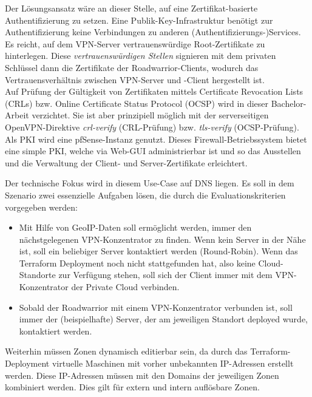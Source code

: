 Der Lösungsansatz wäre an dieser Stelle, auf eine Zertifikat-basierte Authentifizierung zu setzen. Eine Publik-Key-Infrastruktur benötigt zur Authentifizierung keine Verbindungen zu anderen (Authentifizierungs-)Services. Es reicht, auf dem VPN-Server vertrauenswürdige Root-Zertifikate zu hinterlegen. Diese \textit{vertrauenswürdigen Stellen} signieren mit dem privaten Schlüssel dann die Zertifikate der Roadwarrior-Clients, wodurch das Vertrauensverhältnis zwischen VPN-Server und -Client hergestellt ist.\\
Auf Prüfung der Gültigkeit von Zertifikaten mittels Certificate Revocation Lists (CRLs) bzw. Online Certificate Status Protocol (OCSP) wird in dieser Bachelor-Arbeit verzichtet. Sie ist aber prinzipiell möglich mit der serverseitigen OpenVPN-Direktive \textit{crl-verify} (CRL-Prüfung) bzw. \textit{tls-verify} (OCSP-Prüfung).\cite[S.116, S.325-327]{Keijser2011}\\
Als PKI wird eine pfSense-Instanz genutzt. Dieses Firewall-Betriebssystem bietet eine simple PKI, welche via Web-GUI administrierbar ist und so das Ausstellen und die Verwaltung der Client- und Server-Zertifikate erleichtert.\cite[S.376-383]{Netgate2020}

Der technische Fokus wird in diesem Use-Case auf DNS liegen. Es soll in dem Szenario zwei essenzielle Aufgaben lösen, die durch die Evaluationskriterien vorgegeben werden:
\begin{itemize}
\item Mit Hilfe von GeoIP-Daten soll ermöglicht werden, immer den nächstgelegenen VPN-Konzentrator zu finden. Wenn kein Server in der Nähe ist, soll ein beliebiger Server kontaktiert werden (Round-Robin). Wenn das Terraform Deployment noch nicht stattgefunden hat, also keine Cloud-Standorte zur Verfügung stehen, soll sich der Client immer mit dem VPN-Konzentrator der Private Cloud verbinden.
\item Sobald der Roadwarrior mit einem VPN-Konzentrator verbunden ist, soll immer der (beispielhafte) Server, der am jeweiligen Standort deployed wurde, kontaktiert werden.
\end{itemize}

Weiterhin müssen Zonen dynamisch editierbar sein, da durch das Terraform-Deployment virtuelle Maschinen mit vorher unbekannten IP-Adressen erstellt werden. Diese IP-Adressen müssen mit den Domains der jeweiligen Zonen kombiniert werden. Dies gilt für extern und intern auflösbare Zonen. 


